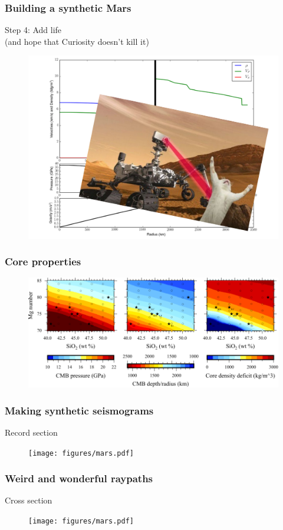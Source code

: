 \documentclass[compress,framenumber]{beamer}
\begin{document}
\begin{frame}
  \frametitle{Building a synthetic Mars}
  Step 4: Add life \\(and hope that Curiosity doesn't kill it)
  \vspace{-0.5em}
  \begin{figure}
    \includegraphics[width=0.7\linewidth]{figures/example_profile_with_life.pdf}
  \end{figure}
\end{frame}

\begin{frame}
  \frametitle{Core properties}
  \vspace{-1.em}
  \begin{figure}
    \includegraphics[width=0.95\linewidth]{figures/cmb_pressures_1673.pdf}
  \end{figure}
\end{frame}

\begin{frame}
  \frametitle{Making synthetic seismograms}
  Record section
  \vspace{-2.0em}
  \begin{figure}
    \texttt{[image: figures/mars.pdf]}
  \end{figure}
\end{frame}

\begin{frame}
  \frametitle{Weird and wonderful raypaths}
  Cross section
  \vspace{-2.0em}
  \begin{figure}
    \texttt{[image: figures/mars.pdf]}
  \end{figure}
\end{frame}
\end{document}
